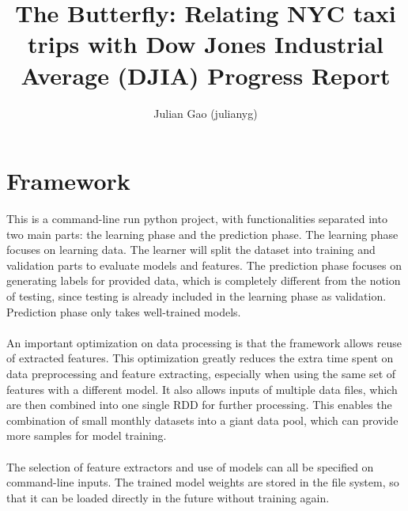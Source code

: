 \documentclass[a4paper]{article}
\title{The Butterfly: Relating NYC taxi trips with Dow Jones Industrial Average (DJIA) Progress Report}
\author{Julian Gao (julianyg)}
\begin{document}
\maketitle
\section{Framework}
This is a command-line run python project, with functionalities separated into two main parts: the learning phase and the prediction phase. The learning phase focuses on learning data. The learner will split the dataset into training and validation parts to evaluate models and features. The prediction phase focuses on generating labels for provided data, which is completely different from the notion of testing, since testing is already included in the learning phase as validation. Prediction phase only takes well-trained models.\\\\
An important optimization on data processing is that the framework allows reuse of extracted features. This optimization greatly reduces the extra time spent on data preprocessing and feature extracting, especially when using the same set of features with a different model. It also allows inputs of multiple data files, which are then combined into one single RDD for further processing. This enables the combination of small monthly datasets into a giant data pool, which can provide more samples for model training. 
\\\\
The selection of feature extractors and use of models can all be specified on command-line inputs. The trained model weights are stored in the file system, so that it can be loaded directly in the future  without training again.
\end{document}
